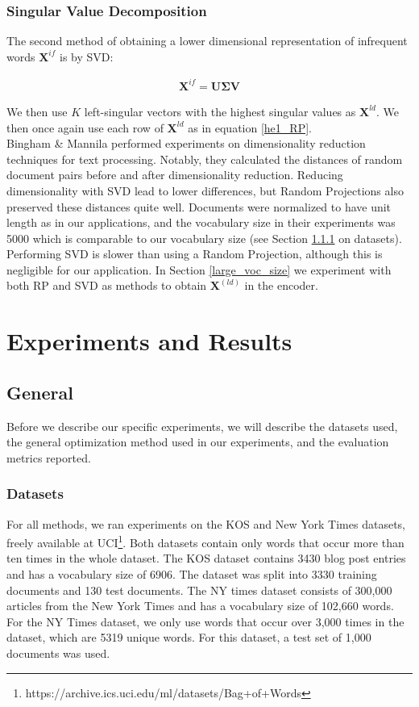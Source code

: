\documentclass{report}
\begin{document}
\subsection{Singular Value Decomposition}\label{SVD}
The second method of obtaining a lower dimensional representation of infrequent words $\mathbf{X}^{if}$ is by SVD:

\begin{align}
\mathbf{X}^{if} = \mathbf{U\Sigma V}
\end{align}

We then use $K$ left-singular vectors with the highest singular values as $\mathbf{X}^{ld}$. We then once again use each row of $\mathbf{X}^{ld}$ as in equation \ref{he1_RP}.\\
 Bingham \& Mannila \cite{bingham2001random} performed experiments on dimensionality reduction techniques for text processing. Notably, they calculated the distances of random document pairs before and after dimensionality reduction. Reducing dimensionality with SVD lead to lower differences, but Random Projections also preserved these distances quite well. Documents were normalized to have unit length as in our applications, and the vocabulary size in their experiments was 5000 which is comparable to our vocabulary size (see Section \ref{datasets} on datasets). Performing SVD is slower than using a Random Projection, although this is negligible for our application. In Section \ref{large_voc_size} we experiment with both RP and SVD as methods to obtain $\mathbf{X}^{(ld)}$ in the encoder.


\chapter{Experiments and Results}\label{experiments}
\section{General}
Before we describe our specific experiments, we will describe the datasets used, the general optimization method used in our experiments, and the evaluation metrics reported. 
	\subsection{Datasets}\label{datasets}
	For all methods, we ran experiments on the KOS and New York Times datasets, freely available at UCI\footnote{https://archive.ics.uci.edu/ml/datasets/Bag+of+Words}. Both datasets contain only words that occur more than ten times in the whole dataset. The KOS dataset contains 3430 blog post entries and has a vocabulary size of 6906. The dataset was split into 3330 training documents and 130 test documents. The NY times dataset consists of 300,000 articles from the New York Times and has a vocabulary size of 102,660 words. For the NY Times dataset, we only use words that occur over 3,000 times in the dataset, which are 5319 unique words. For this dataset, a test set of 1,000 documents was used.
	
\end{document}
